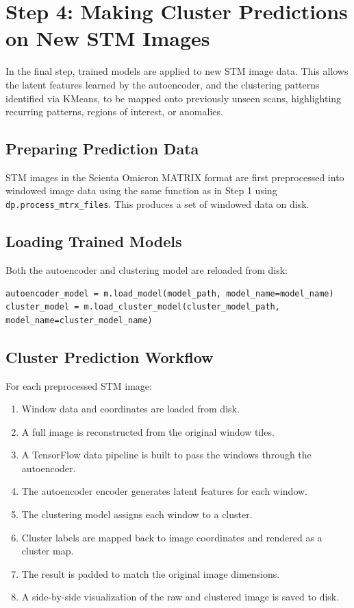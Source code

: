 \documentclass[11pt]{article}
\begin{document}
\section*{Step 4: Making Cluster Predictions on New STM Images}

In the final step, trained models are applied to new STM image data. This allows the latent features learned by the autoencoder, and the clustering patterns identified via KMeans, to be mapped onto previously unseen scans, highlighting recurring patterns, regions of interest, or anomalies.

\subsection*{Preparing Prediction Data}

STM images in the Scienta Omicron MATRIX format are first preprocessed into windowed image data using the same function as in Step 1 using \texttt{dp.process\_mtrx\_files}. This produces a set of windowed data on disk. 

\subsection*{Loading Trained Models}

Both the autoencoder and clustering model are reloaded from disk:

\begin{verbatim}
autoencoder_model = m.load_model(model_path, model_name=model_name)
cluster_model = m.load_cluster_model(cluster_model_path, model_name=cluster_model_name)
\end{verbatim}

\subsection*{Cluster Prediction Workflow}

For each preprocessed STM image:

\begin{enumerate}
  \item Window data and coordinates are loaded from disk.
  \item A full image is reconstructed from the original window tiles.
  \item A TensorFlow data pipeline is built to pass the windows through the autoencoder.
  \item The autoencoder encoder generates latent features for each window.
  \item The clustering model assigns each window to a cluster.
  \item Cluster labels are mapped back to image coordinates and rendered as a cluster map.
  \item The result is padded to match the original image dimensions.
  \item A side-by-side visualization of the raw and clustered image is saved to disk.
\end{enumerate}
\end{document}
